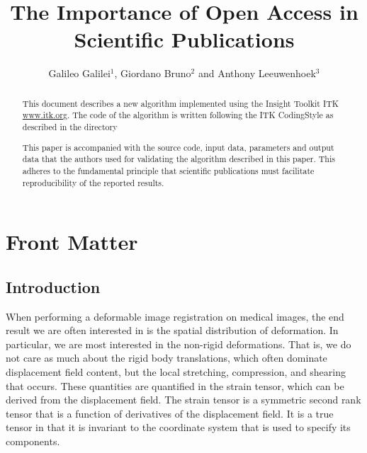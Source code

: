 \documentclass{InsightArticle}
\title{The Importance of Open Access in Scientific Publications}
\author{Galileo Galilei$^{1}$, Giordano Bruno$^{2}$ and Anthony Leeuwenhoek$^{3}$}
\newcommand{\IJhandlerIDnumber}{1338}
\begin{document}
%
%
\IJhandlefooter{\IJhandlerIDnumber}


\ifpdf
\else
\fi


\maketitle


\ifhtml
\chapter*{Front Matter\label{front}}
\fi


\begin{abstract}
\noindent
This document describes a new algorithm implemented using the Insight Toolkit
ITK \url{www.itk.org}.  The code of the algorithm is written following the
ITK CodingStyle as described in the directory


This paper is accompanied with the source code, input data, parameters and
output data that the authors used for validating the algorithm described in
this paper. This adheres to the fundamental principle that scientific
publications must facilitate reproducibility of the reported results.

\end{abstract}

\IJhandlenote{\IJhandlerIDnumber}

\tableofcontents

\section{Introduction}

When performing a deformable image registration on medical images, the end
result we are often interested in is the spatial distribution of deformation.
In particular, we are most interested in the non-rigid deformations. That is,
we do not care as much about the rigid body translations, which often dominate
displacement field content, but the local stretching, compression, and
shearing that occurs. These quantities are quantified in the strain tensor,
which can be derived from the displacement field. The strain tensor is a
symmetric second rank tensor that is a function of derivatives of the
displacement field. It is a true tensor in that it is invariant to the
coordinate system that is used to specify its components.
\end{document}
